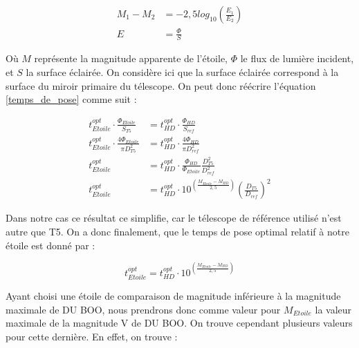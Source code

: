 \documentclass[10pt,french, openany]{book}
\begin{document}
    \begin{align}
        M_1 - M_2 &= - 2,5 log_{10}\left(\frac{E_1}{E_2}\right) \\
        E &= \frac{\Phi}{S}
    \end{align}
    
    Où $M$ représente la magnitude apparente de l'étoile, $\Phi$ le flux de lumière incident, et $S$ la surface éclairée. On considère ici que la surface éclairée correspond à la surface du miroir primaire du télescope. On peut donc réécrire l'équation \eqref{temps_de_pose} comme suit :
    
    \begin{align*}
        t^{opt}_{Etoile} \cdot \frac{\Phi_{Etoile}}{S_{T5}} &= t^{opt}_{HD} \cdot \frac{\Phi_{HD}}{S_{ref}} \\
        t^{opt}_{Etoile} \cdot \frac{4\Phi_{Etoile}}{\pi D_{T5}^2} &= t^{opt}_{HD} \cdot \frac{4\Phi_{HD}}{\pi D_{ref}^2} \\
        t^{opt}_{Etoile} &= t^{opt}_{HD} \cdot \frac{\Phi_{HD}}{\Phi_{Etoile}}\frac{D_{T5}^2}{D_{ref}^2} \\
        t^{opt}_{Etoile} &= t^{opt}_{HD} \cdot 10 ^{\left(\frac{M_{Etoile} - M_{HD}}{2,5}\right)} \left( \frac{D_{T5}}{D_{ref}} \right) ^2
    \end{align*}
    
    Dans notre cas ce résultat ce simplifie, car le télescope de référence utilisé n'est autre que T5. On a donc finalement, que le temps de pose optimal relatif à notre étoile est donné par :
    
    \begin{equation}
        t^{opt}_{Etoile} = t^{opt}_{HD} \cdot 10 ^{\left(\frac{M_{Etoile} - M_{HD}}{2,5}\right)}
    \end{equation}
    
    Ayant choisi une étoile de comparaison de magnitude inférieure à la magnitude maximale de DU BOO, nous prendrons donc comme valeur pour $M_{Etoile}$ la valeur maximale de la magnitude V de DU BOO. On trouve cependant plusieurs valeurs pour cette dernière. En effet, on trouve :
    
\end{document}
